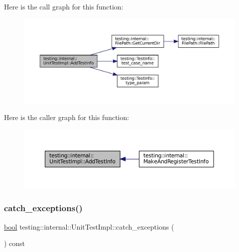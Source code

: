 Here is the call graph for this function\+:
\nopagebreak
\begin{figure}[H]
\begin{center}
\leavevmode
\includegraphics[width=350pt]{classtesting_1_1internal_1_1UnitTestImpl_a1cc87dfc91377ebec4a3ff4192dfcba9_cgraph}
\end{center}
\end{figure}
Here is the caller graph for this function\+:
\nopagebreak
\begin{figure}[H]
\begin{center}
\leavevmode
\includegraphics[width=350pt]{classtesting_1_1internal_1_1UnitTestImpl_a1cc87dfc91377ebec4a3ff4192dfcba9_icgraph}
\end{center}
\end{figure}
\mbox{\label{classtesting_1_1internal_1_1UnitTestImpl_aa311b980783a9cfb547831f7b19e3f3a}} 
\subsubsection{\texorpdfstring{catch\+\_\+exceptions()}{catch\_exceptions()}}
{\footnotesize\ttfamily \hyperlink{classbool}{bool} testing\+::internal\+::\+Unit\+Test\+Impl\+::catch\+\_\+exceptions (\begin{DoxyParamCaption}{ }\end{DoxyParamCaption}) const\hspace{0.3cm}{\ttfamily [inline]}}




